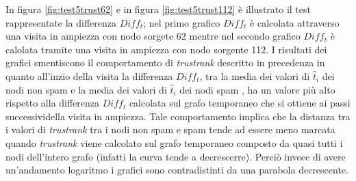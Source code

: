 In figura \ref{fig:test5trust62} e in figura \ref{fig:test5trust112} è illustrato il test rappresentate la differenza \(Diff_t\); nel primo grafico \(Diff_t\) è calcolata attraverso una visita in ampiezza con nodo sorgete 62 mentre nel secondo grafico \(Diff_t\) è calolata tramite una visita in ampiezza con nodo sorgente 112. I risultati dei grafici smentiscono il comportamento di \textit{trustrank} descritto in precedenza in quanto all'inzio della visita la differenza \(Diff_t\), tra la media dei valori di  \(\hat{t}_i\) dei nodi non spam e la media dei valori di \(\hat{t}_i\)  dei  nodi spam , ha un valore più alto rispetto alla differenza \(Diff_t\) calcolata sul grafo temporaneo che si ottiene ai passi successividella visita in ampiezza. Tale comportamento implica che la distanza tra i valori di \textit{trustrank} tra i nodi non spam e spam tende ad essere meno marcata quando \textit{trustrank} viene calcolato sul grafo temporaneo composto da quasi tutti i nodi dell'intero grafo (infatti la curva tende a decrescerre). Perciò invece di avere un'andamento logaritmo i grafici sono contradistinti da una parabola decrescente.

